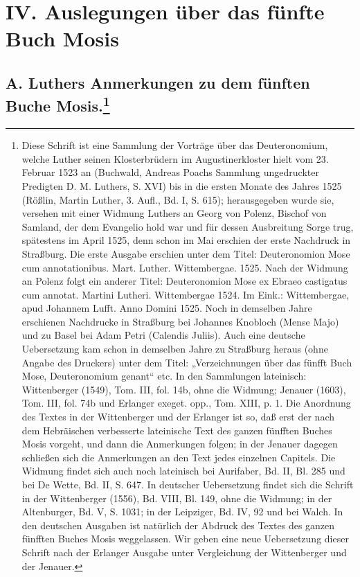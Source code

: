 \part{IV. Auslegungen über das fünfte Buch Mosis}

\chapter[A. Luthers Anmerkungen zu dem fünften Buche Mosis]{A. Luthers Anmerkungen zu dem fünften Buche Mosis.\footnote{Diese Schrift ist eine Sammlung der Vorträge über das Deuteronomium, welche Luther seinen Klosterbrüdern im Augustinerkloster hielt vom 23. Februar 1523 an (Buchwald, Andreas Poachs Sammlung ungedruckter Predigten D. M. Luthers, S. XVI) bis in die ersten Monate des Jahres 1525 (Rößlin, Martin Luther, 3. Aufl., Bd. I, S. 615); herausgegeben wurde sie, versehen mit einer Widmung Luthers an Georg von Polenz, Bischof von Samland, der dem Evangelio hold war und für dessen Ausbreitung Sorge trug, spätestens im April 1525, denn schon im Mai erschien der erste Nachdruck in Straßburg. Die erste Ausgabe erschien unter dem Titel: Deuteronomion Mose cum annotationibus. Mart. Luther. Wittembergae. 1525. Nach der Widmung an Polenz folgt ein anderer Titel: Deuteronomion Mose ex Ebraeo castigatus cum annotat. Martini Lutheri. Wittembergae 1524. Im Eink.: Wittembergae, apud Johannem Lufft. Anno Domini 1525. Noch in demselben Jahre erschienen Nachdrucke in Straßburg bei Johannes Knobloch (Mense Majo) und zu Basel bei Adam Petri (Calendis Juliis). Auch eine deutsche Uebersetzung kam schon in demselben Jahre zu Straßburg heraus (ohne Angabe des Druckers) unter dem Titel: „Verzeichnungen über das fünfft Buch Mose, Deuteronomium genant“ etc. In den Sammlungen lateinisch: Wittenberger (1549), Tom. III, fol. 14b, ohne die Widmung; Jenauer (1603), Tom. III, fol. 74b und Erlanger exeget. opp., Tom. XIII, p. 1. Die Anordnung des Textes in der Wittenberger und der Erlanger ist so, daß erst der nach dem Hebräischen verbesserte lateinische Text des ganzen fünfften Buches Mosis vorgeht, und dann die Anmerkungen folgen; in der Jenauer dagegen schließen sich die Anmerkungen an den Text jedes einzelnen Capitels. Die Widmung findet sich auch noch lateinisch bei Aurifaber, Bd. II, Bl. 285 und bei De Wette, Bd. II, S. 647. In deutscher Uebersetzung findet sich die Schrift in der Wittenberger (1556), Bd. VIII, Bl. 149, ohne die Widmung; in der Altenburger, Bd. V, S. 1031; in der Leipziger, Bd. IV, 92 und bei Walch. In den deutschen Ausgaben ist natürlich der Abdruck des Textes des ganzen fünfften Buches Mosis weggelassen. Wir geben eine neue Uebersetzung dieser Schrift nach der Erlanger Ausgabe unter Vergleichung der Wittenberger und der Jenauer.}}

